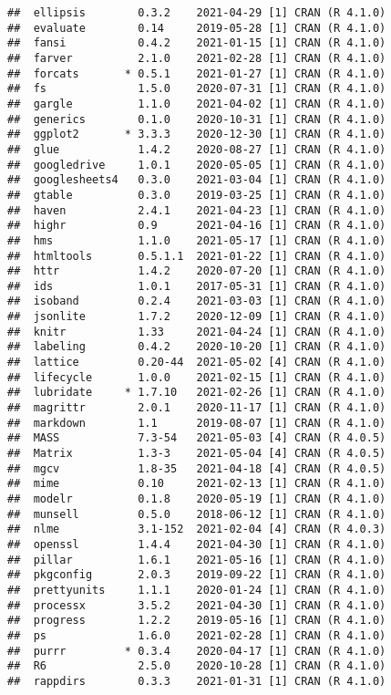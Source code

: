 \documentclass[]{ctexart}
\begin{document}
\begin{verbatim}
##  ellipsis        0.3.2    2021-04-29 [1] CRAN (R 4.1.0)
##  evaluate        0.14     2019-05-28 [1] CRAN (R 4.1.0)
##  fansi           0.4.2    2021-01-15 [1] CRAN (R 4.1.0)
##  farver          2.1.0    2021-02-28 [1] CRAN (R 4.1.0)
##  forcats       * 0.5.1    2021-01-27 [1] CRAN (R 4.1.0)
##  fs              1.5.0    2020-07-31 [1] CRAN (R 4.1.0)
##  gargle          1.1.0    2021-04-02 [1] CRAN (R 4.1.0)
##  generics        0.1.0    2020-10-31 [1] CRAN (R 4.1.0)
##  ggplot2       * 3.3.3    2020-12-30 [1] CRAN (R 4.1.0)
##  glue            1.4.2    2020-08-27 [1] CRAN (R 4.1.0)
##  googledrive     1.0.1    2020-05-05 [1] CRAN (R 4.1.0)
##  googlesheets4   0.3.0    2021-03-04 [1] CRAN (R 4.1.0)
##  gtable          0.3.0    2019-03-25 [1] CRAN (R 4.1.0)
##  haven           2.4.1    2021-04-23 [1] CRAN (R 4.1.0)
##  highr           0.9      2021-04-16 [1] CRAN (R 4.1.0)
##  hms             1.1.0    2021-05-17 [1] CRAN (R 4.1.0)
##  htmltools       0.5.1.1  2021-01-22 [1] CRAN (R 4.1.0)
##  httr            1.4.2    2020-07-20 [1] CRAN (R 4.1.0)
##  ids             1.0.1    2017-05-31 [1] CRAN (R 4.1.0)
##  isoband         0.2.4    2021-03-03 [1] CRAN (R 4.1.0)
##  jsonlite        1.7.2    2020-12-09 [1] CRAN (R 4.1.0)
##  knitr           1.33     2021-04-24 [1] CRAN (R 4.1.0)
##  labeling        0.4.2    2020-10-20 [1] CRAN (R 4.1.0)
##  lattice         0.20-44  2021-05-02 [4] CRAN (R 4.1.0)
##  lifecycle       1.0.0    2021-02-15 [1] CRAN (R 4.1.0)
##  lubridate     * 1.7.10   2021-02-26 [1] CRAN (R 4.1.0)
##  magrittr        2.0.1    2020-11-17 [1] CRAN (R 4.1.0)
##  markdown        1.1      2019-08-07 [1] CRAN (R 4.1.0)
##  MASS            7.3-54   2021-05-03 [4] CRAN (R 4.0.5)
##  Matrix          1.3-3    2021-05-04 [4] CRAN (R 4.0.5)
##  mgcv            1.8-35   2021-04-18 [4] CRAN (R 4.0.5)
##  mime            0.10     2021-02-13 [1] CRAN (R 4.1.0)
##  modelr          0.1.8    2020-05-19 [1] CRAN (R 4.1.0)
##  munsell         0.5.0    2018-06-12 [1] CRAN (R 4.1.0)
##  nlme            3.1-152  2021-02-04 [4] CRAN (R 4.0.3)
##  openssl         1.4.4    2021-04-30 [1] CRAN (R 4.1.0)
##  pillar          1.6.1    2021-05-16 [1] CRAN (R 4.1.0)
##  pkgconfig       2.0.3    2019-09-22 [1] CRAN (R 4.1.0)
##  prettyunits     1.1.1    2020-01-24 [1] CRAN (R 4.1.0)
##  processx        3.5.2    2021-04-30 [1] CRAN (R 4.1.0)
##  progress        1.2.2    2019-05-16 [1] CRAN (R 4.1.0)
##  ps              1.6.0    2021-02-28 [1] CRAN (R 4.1.0)
##  purrr         * 0.3.4    2020-04-17 [1] CRAN (R 4.1.0)
##  R6              2.5.0    2020-10-28 [1] CRAN (R 4.1.0)
##  rappdirs        0.3.3    2021-01-31 [1] CRAN (R 4.1.0)

\end{verbatim}
\end{document}
